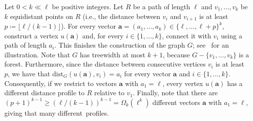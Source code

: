 \documentclass[11pt,a4paper]{article}
\newcommand{\dist}{\mathrm{dist}}
\renewcommand{\geq}{\geqslant}
\begin{document}
Let $0 < k \ll \ell$ be positive integers.
Let $R$ be a path of length $\ell$ and $v_1,\ldots,v_k$ be $k$ equidistant
points on $R$ (i.e., the distance between $v_i$ and $v_{i+1}$ is at least $p \coloneqq \lfloor \ell/(k-1) \rfloor$).
For every vector $\mathbf{a} = (a_1,\ldots,a_k) \in \{\ell, \ldots, \ell + p \}^k$,
construct a vertex $u(\mathbf{a})$ and, for every $i\in \{1,\ldots,k\}$, connect it with
$v_i$ using a path of length $a_i$.
This finishes the construction of the graph $G$; see~ for an illustration.
Note that $G$ has treewidth at most $k+1$, because $G-\{v_1,\ldots,v_k\}$ is a forest.
Furthermore, since the distance between consecutive vertices $v_i$ is at least $p$, we have that
  $\dist_G(u(\mathbf{a}), v_i) = a_i$ for every vector $\mathbf{a}$ and $i\in \{1,\ldots,k\}$.
Consequently, if we restrict to vectors $\mathbf{a}$ with $a_1 = \ell$, 
every vertex $u(\mathbf{a})$ has a different distance profile to $R$ relative to $v_1$.
Finally, note that there are $(p + 1)^{k-1} \geq (\ell/(k-1))^{k-1} = \Omega_k(\ell^k)$ different
vectors $\mathbf{a}$ with $a_1=\ell$, giving that many different~profiles.
\end{document}
